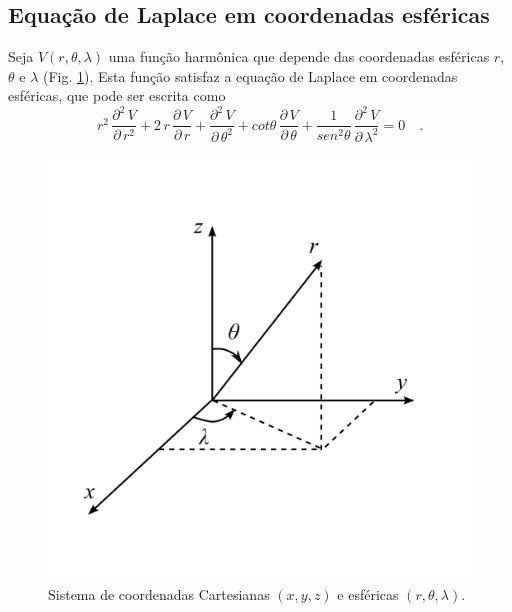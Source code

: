 \documentclass[10pt,a4paper,fleqn]{article}
\begin{document}
\begin{flushleft}
\dotfill
\end{flushleft}

\subsection{Equaç\~{a}o de Laplace em coordenadas esf\'{e}ricas}

Seja $V(r,\theta,\lambda)$ uma funç\~{a}o harm\^{o}nica que depende das coordenadas esf\'{e}ricas $r$, $\theta$ e $\lambda$ 
(Fig. \ref{fig:fig2}). Esta funç\~{a}o satisfaz a equaç\~{a}o de Laplace em coordenadas esf\'{e}ricas, que pode ser escrita como
\begin{equation}
r^{2} \, \frac{\partial^{2} \, V}{\partial \, r^{2}} +
2 \, r \, \frac{\partial \, V}{\partial \, r} +
\frac{\partial^{2} \, V}{\partial \, \theta^{2}} +
cot \theta \, \frac{\partial \, V}{\partial \, \theta} +
\frac{1}{sen^{2} \theta} \, \frac{\partial^{2} \, V}{\partial \, \lambda^{2}} = 0 \quad .
\label{eq:ex214-eq-Laplace-esferica}
\end{equation}

\begin{figure}[h]
    \centering
    \includegraphics[scale=1]{Figs/Fig2.png}
    \caption{Sistema de coordenadas Cartesianas $(x,y,z)$ e esf\'{e}ricas $(r,\theta,\lambda)$.}
    \label{fig:fig2}
\end{figure}
\end{document}
